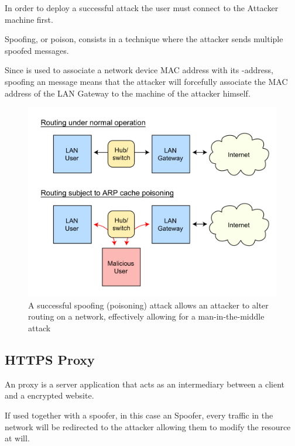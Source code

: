 In order to deploy a successful  attack the user must connect to the Attacker machine first.

 Spoofing, or  poison, consists in a technique where the attacker sends multiple spoofed  messages.

Since  is used to associate a network device MAC address with its -address, spoofing an  message means that the attacker will forcefully associate the MAC address of the LAN Gateway to the machine of the attacker himself.

\begin{figure}[h!]
 \centering
 \includegraphics[width=13cm]{img/ARP_Spoofing.png}
 \caption{A successful  spoofing (poisoning) attack allows an attacker to alter routing on a network, effectively allowing for a man-in-the-middle attack\cite{arp-spoofing}}
 \label{fig: ARP Spoofing}
\end{figure}

\newpage

\subsection{HTTPS Proxy}

An  proxy is a server application that acts as an intermediary between a client and a  encrypted website.

If used together with a spoofer, in this case an  Spoofer, every  traffic in the network will be redirected to the attacker allowing them to modify the resource at will.

